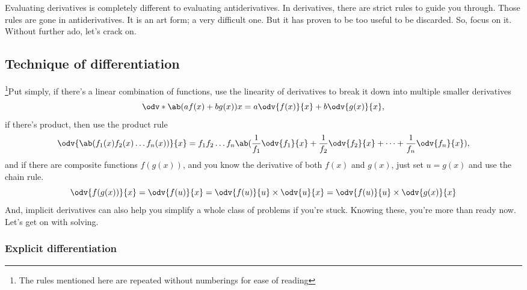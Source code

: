 Evaluating derivatives is completely different to evaluating antiderivatives. In derivatives, there are strict rules to guide you through. Those rules are gone in antiderivatives. It is an art form; a very difficult one. But it has proven to be too useful to be discarded. So, focus on it. Without further ado, let's crack on. 

\subsection{Technique of differentiation}

\footnote{The rules mentioned here are repeated without numberings for ease of reading}Put simply, if there's a linear combination of functions, use the linearity of derivatives to break it down into multiple smaller derivatives
\begin{equation*}
	\odv*{\ab(af(x) + bg(x))}{x} = a\odv{f(x)}{x} + b\odv{g(x)}{x},
\end{equation*}
if there's product, then use the product rule
\begin{equation*}
	\odv{\ab(f_1(x)f_2(x)\dots f_n(x))}{x} = f_1f_2\dots f_n\ab(\frac{1}{f_1}\odv{f_1}{x} + \frac{1}{f_2}\odv{f_2}{x} + \dots + \frac{1}{f_n}\odv{f_n}{x}),
\end{equation*}
and if there are composite functions $f(g(x))$, and you know the derivative of both $f(x)$ and $g(x)$, just set $u = g(x)$ and use the chain rule.
\begin{equation*}
	\odv{f(g(x))}{x} = \odv{f(u)}{x} = \odv{f(u)}{u} \times \odv{u}{x} = \odv{f(u)}{u} \times \odv{g(x)}{x}
\end{equation*}
And, implicit derivatives can also help you simplify a whole class of problems if you're stuck. Knowing these, you're more than ready now. Let's get on with solving.

\subsubsection{Explicit differentiation}

